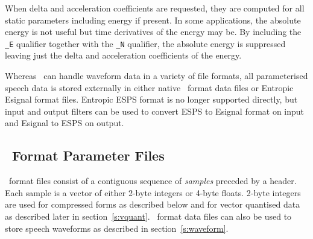 When delta and acceleration coefficients are requested, they are computed for
all static parameters including energy if present.  In some applications, the
absolute energy is not useful but time derivatives of the energy may be.  By
including the \texttt{\_E} qualifier together with the
\texttt{\_N} qualifier, the absolute energy
is suppressed leaving just the delta and acceleration coefficients of the
energy.


Whereas \HTK\ can handle waveform data in a variety of file formats,
all parameterised speech data is stored externally in either native
\HTK\ format data files or Entropic Esignal format files.
Entropic ESPS format is no longer supported directly, but input and output
filters can be used to convert ESPS to Esignal format on input and
Esignal to ESPS on output.

\subsection{\HTK\ Format Parameter Files}

\HTK\ format files consist of a contiguous sequence of \textit{samples}
preceded by a header.  Each sample is a vector of either 2-byte integers or
4-byte floats.  2-byte integers are used for compressed forms as described
below and for vector quantised data as described later in
section~\ref{s:vquant}.  \HTK\ format data files can also be used to store
speech waveforms as described in section~\ref{s:waveform}.  

